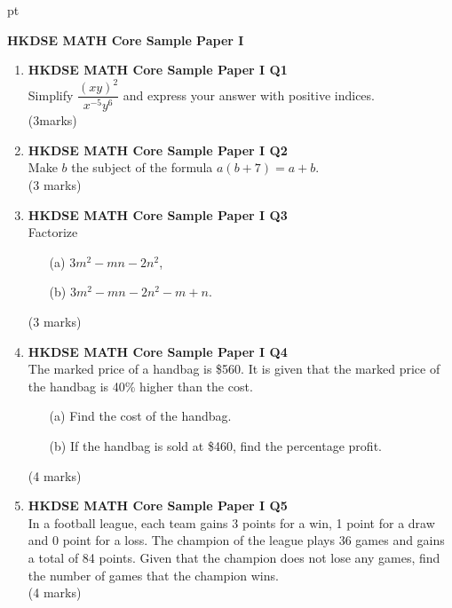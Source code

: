 \documentclass[12pt]{article}
\begin{document}
 pt
\begin{center}
	{\large \bf HKDSE MATH Core Sample Paper I}\\
	\vspace{2 mm}
\end{center}
\vspace{0.05cm}

\begin{enumerate}
	\item \textbf{HKDSE MATH Core Sample Paper I Q1}\\
	Simplify $\dfrac{(xy)^2}{x^{-5}y^6}$ and express your answer with positive indices. \\(3marks)

	\item \textbf{HKDSE MATH Core Sample Paper I Q2}\\
	Make $b$ the subject of the formula $a(b+7) = a+b$. \\(3 marks)

	\item \textbf{HKDSE MATH Core Sample Paper I Q3}\\
	Factorize 
	\begin{enumerate}
		\item[(a)] $3m^2-mn-2n^2$,
		\item[(b)] $3m^2-mn-2n^2-m+n$.
	\end{enumerate}
	(3 marks)

	\item \textbf{HKDSE MATH Core Sample Paper I Q4}\\
	The marked price of a handbag is \$560. It is  given that the marked price of the handbag is 40\% higher than the cost.
	\begin{enumerate}
		\item[(a)] Find the cost of the handbag.
		\item[(b)] If the handbag is sold at \$460, find the percentage profit.
	\end{enumerate}
	(4 marks)

	\item \textbf{HKDSE MATH Core Sample Paper I Q5}\\
	In a football league, each team gains 3 points for a win, 1 point for a draw and 0 point for a loss. The champion of the league plays 36 games and gains a total of 84 points. Given that the champion does not lose any games, find the number of games that the champion wins. \\(4 marks)
	

\end{enumerate}
\end{document}
